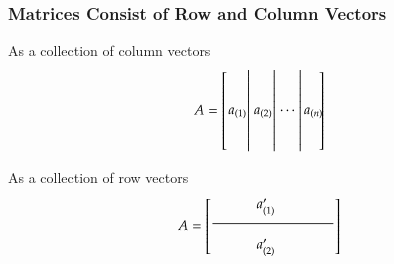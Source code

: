 \documentclass[10pt]{beamer}
\begin{document}
\begin{frame}
\frametitle{Matrices Consist of Row and Column Vectors}

\begin{minipage}[t]{0.45\textwidth}
As a collection of column vectors
\begin{equation*}
    A =
    \begin{bmatrix}\left. \begin{matrix} \\ \\ a_{(1)}  \\ \\ \\ \end{matrix}\right|
                   \left. \begin{matrix} \\ \\ a_{(2)}  \\ \\ \\ \end{matrix}\right|
                   \left. \begin{matrix} \\ \\ {\cdots\ } \\ \\ \\ \end{matrix}\right|
                          \begin{matrix} \\ \\ a_{(n)}  \\ \\ \\ \end{matrix}\negthickspace
    \end{bmatrix}
\end{equation*}
\end{minipage}
\hspace{3ex}
\begin{minipage}[t]{0.45\textwidth}
As a collection of row vectors
\begin{equation*}
    A =
    \begin{bmatrix}\begin{matrix} & & a'_{(1)}& & & \end{matrix} \\
                   \dfrac{\makebox[1.2in]{}}{\makebox[1.2in]{}} \\
                   \begin{matrix} & & a'_{(2)}& & & \end{matrix} \\

\end{bmatrix}
\end{equation*}
\end{minipage}
\end{frame}
\end{document}

